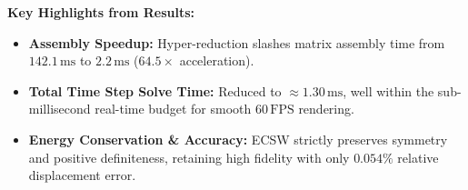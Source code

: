 \documentclass[11pt,a4paper]{article}
\begin{document}
\begin{table}[htbp]
    \centering
    \caption{Comparative performance metrics between Full Order and Reduced Order Models.}
    \label{tab:summary_metrics}
\end{table}

\noindent \textbf{Key Highlights from Results:}
\begin{itemize}[leftmargin=*]
    \item \textbf{Assembly Speedup:} Hyper-reduction slashes matrix assembly time from $142.1\,\text{ms}$ to $2.2\,\text{ms}$ ($64.5\times$ acceleration).
    \item \textbf{Total Time Step Solve Time:} Reduced to $\approx 1.30\,\text{ms}$, well within the sub-millisecond real-time budget for smooth $60\,\text{FPS}$ rendering.
    \item \textbf{Energy Conservation \& Accuracy:} ECSW strictly preserves symmetry and positive definiteness, retaining high fidelity with only $0.054\%$ relative displacement error.
\end{itemize}

\end{document}
